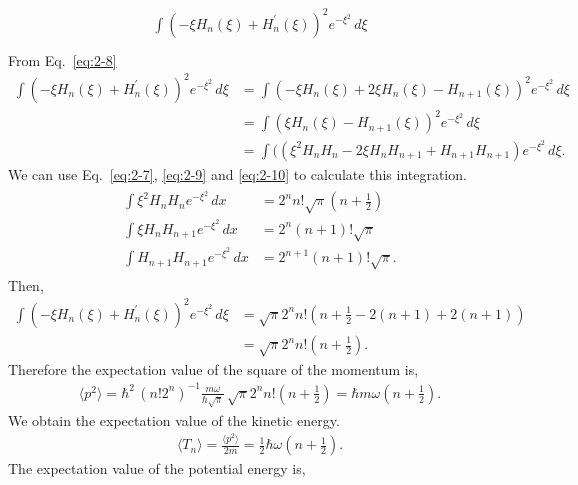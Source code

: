 \documentclass[floatfix,nofootinbib,superscriptaddress,fleqn]{revtex4-2}
\begin{document}
\begin{itemize}
\begin{align*}
\begin{split}
      \int(-\xi H_n\left(\xi\right) 
      +H^\prime_n\left(\xi\right))^2 e^{-\xi^2}\,d\xi  \\
    \end{split}
  \end{align*}
  From Eq.~\eqref{eq:2-8}
  \begin{align*}
      \int(-\xi H_n\left(\xi\right) 
      +H^\prime_n\left(\xi\right))^2 e^{-\xi^2}\,d\xi
      &=\int(-\xi H_n\left(\xi\right) 
      + 2\xi H_n(\xi)-H_{n+1}(\xi))^2 e^{-\xi^2}\,d\xi  \\
      &=\int(\xi H_n\left(\xi\right) 
      -H_{n+1}(\xi))^2 e^{-\xi^2}\,d\xi \\
      &=\int(
      (\xi^2H_nH_n-2\xi H_nH_{n+1}+H_{n+1}H_{n+1})  
      e^{-\xi^2}\,d\xi.
  \end{align*}
  We can use Eq.~\eqref{eq:2-7}, \eqref{eq:2-9} and 
  \eqref{eq:2-10} to calculate this integration.
  \begin{align*}
    \begin{split}
      \int \xi^2 H_n H_n e^{-\xi^2}\,dx 
      &= 2^nn!\sqrt{\pi}\left( n+\frac{1}{2} \right) \\  
      \int \xi H_n H_{n+1} e^{-\xi^2}\,dx 
      &= 2^n(n+1)!\sqrt{\pi}\\  
      \int  H_{n+1} H_{n+1} e^{-\xi^2}\,dx 
      &= 2^{n+1}(n+1)!\sqrt{\pi}.
    \end{split}
  \end{align*}
  Then,
  \begin{align*}
      \int(-\xi H_n\left(\xi\right) 
      +H^\prime_n\left(\xi\right))^2 e^{-\xi^2}\,d\xi
      &= \sqrt{\pi}2^nn!
      \left(n+\frac{1}{2}-2(n+1)+2(n+1) \right) \\
      &= \sqrt{\pi}2^nn!\left( n+\frac{1}{2} \right).
  \end{align*}
  Therefore the expectation value of the square of the momentum is,
  \begin{align}\label{eq:3-ps}
    \langle p^2\rangle = \hbar^2\,(n!2^n)^{-1}\frac{m\omega}
    {\hbar\sqrt{\pi}}\,
    \sqrt{\pi}2^nn!\left( n+\frac{1}{2} \right)
    =\hbar m\omega\left( n+\frac{1}{2} \right).
  \end{align}
  We obtain the expectation value of the kinetic energy.
  \begin{align}\label{eq:3-3}
    \langle T_n\rangle=\frac{\langle p^2\rangle}{2m}
    =\frac{1}{2}\hbar \omega\left( n+\frac{1}{2} \right).
  \end{align}
  The expectation value of the potential energy is,
  \begin{align*}

\end{align*}
\end{itemize}
\end{document}
